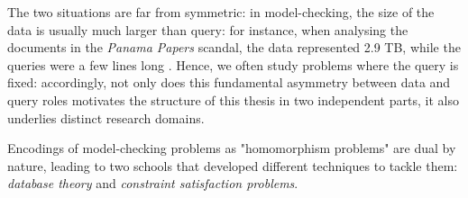 The two situations are far from symmetric: in model-checking, the size of the
data is usually much larger than query:
for instance, when analysing the documents in the \emph{Panama Papers} scandal,
the data represented 2.9 TB, while the queries were a few lines long \cite{Neo4jPanama}.
Hence, we often study problems where the query is fixed:
accordingly, not only does this fundamental asymmetry between data and query roles motivates the structure of this thesis in two independent parts, it also underlies distinct research domains.

\begin{known}
	Encodings of model-checking problems as "homomorphism problems" are dual by nature,
	leading to two schools that developed different techniques to tackle them:
	\emph{database theory} and \emph{constraint satisfaction problems}.
\end{known}


